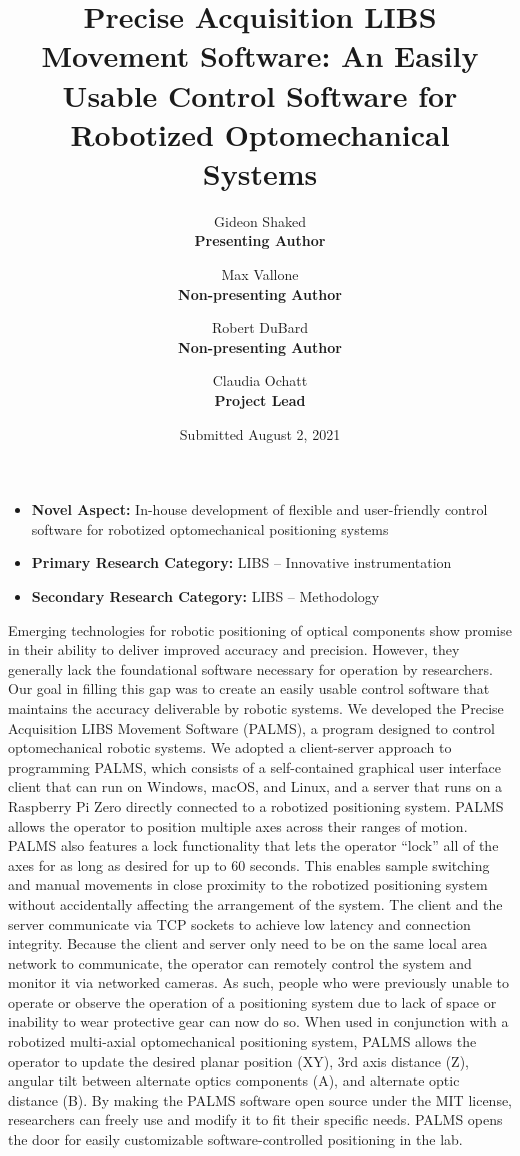 \documentclass[12pt]{article}
\title{Precise Acquisition LIBS Movement Software: An Easily Usable Control Software for Robotized Optomechanical Systems}
\author{
    Gideon Shaked\\
    \textbf{Presenting Author}
    \and
    Max Vallone\\
    \textbf{Non-presenting Author} 
    \and
    Robert DuBard\\
    \textbf{Non-presenting Author}
    \and
    Claudia Ochatt\\
    \textbf{Project Lead}
}
\date{Submitted August 2, 2021}
\begin{document}
    \maketitle

    \begin{itemize}
        \item \textbf{Novel Aspect:} In-house development of flexible and user-friendly control software for robotized optomechanical positioning systems
        \item \textbf{Primary Research Category:} LIBS -- Innovative instrumentation
        \item \textbf{Secondary Research Category:} LIBS -- Methodology
    \end{itemize}

    Emerging technologies for robotic positioning of optical components show promise in their ability to deliver improved accuracy and precision. 
    However, 
    they generally lack the foundational software necessary for operation by researchers. 
    Our goal in filling this gap was to 
    create an easily usable control software that maintains the accuracy deliverable by robotic systems. 
    We developed the Precise Acquisition LIBS Movement Software (PALMS), 
    a program designed to control optomechanical robotic systems. 
    We adopted a client-server approach to programming PALMS\@, 
    which consists of a self-contained graphical user interface client that can run on 
    Windows, 
    macOS, 
    and Linux, 
    and a server that runs on a Raspberry Pi Zero 
    directly connected to a robotized positioning system. 
    PALMS allows the operator to position multiple axes across their ranges of motion. 
    PALMS also features a lock functionality that lets the operator \enquote{lock} all of the axes for as long as desired for up to 60 seconds. 
    This enables sample switching 
    and manual movements 
    in close proximity to the robotized positioning system 
    without accidentally affecting the arrangement of the system. 
    The client and the server communicate via TCP sockets to achieve low latency and connection integrity. 
    Because the client and server only need to be on the same local area network to communicate, 
    the operator can remotely control the system and monitor it via networked cameras. 
    As such, people who were previously unable to operate or observe the operation of a positioning system 
    due to lack of space or inability to wear protective gear 
    can now do so. 
    When used in conjunction with a robotized multi-axial optomechanical positioning system, 
    PALMS allows the operator to update the 
    desired planar position (XY), 
    3rd axis distance (Z), 
    angular tilt between alternate optics components (A), 
    and alternate optic distance (B). 
    By making the PALMS software open source under the MIT license, 
    researchers can freely use and modify it to fit their specific needs. 
    PALMS opens the door for easily customizable software-controlled positioning in the lab.

    \nocite{*}
    \footnotesize{}
\end{document}
